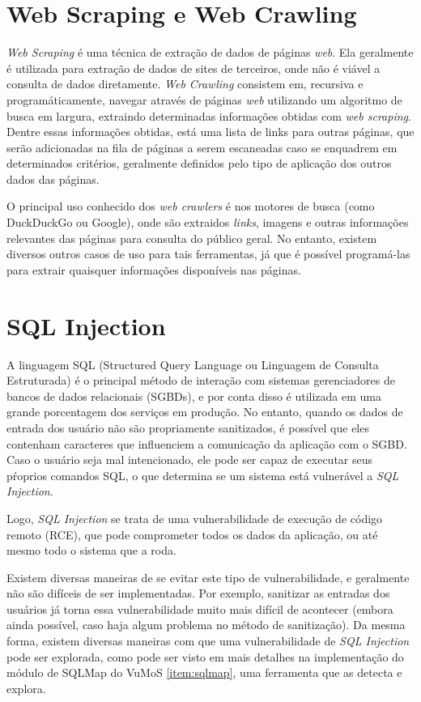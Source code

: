 \section{Web Scraping e Web Crawling}

\textit{Web Scraping} é uma técnica de extração de dados de páginas \textit{web}. Ela geralmente é utilizada para extração de dados de sites de terceiros, onde não é viável a consulta de dados diretamente. 
\textit{Web Crawling} consistem em, recursiva e programáticamente, navegar através de páginas \textit{web} utilizando um algoritmo de busca em largura, extraindo determinadas informações obtidas com \textit{web scraping}. Dentre essas informações obtidas, está uma lista de links para outras páginas, que serão adicionadas na fila de páginas a serem escaneadas caso se enquadrem em determinados critérios, geralmente definidos pelo tipo de aplicação dos outros dados das páginas.

O principal uso conhecido dos \textit{web crawlers} é nos motores de busca (como DuckDuckGo ou Google), onde são extraidos \textit{links}, imagens e outras informações relevantes das páginas para consulta do público geral. No entanto, existem diversos outros casos de uso para tais ferramentas, já que é possível programá-las para extrair quaisquer informações disponíveis nas páginas. 

\section{SQL Injection}

A linguagem SQL (Structured Query Language ou Linguagem de Consulta Estruturada) é o principal método de interação com sistemas gerenciadores de bancos de dados relacionais (SGBDs), e por conta disso é utilizada em uma grande porcentagem dos serviços em produção. No entanto, quando os dados de entrada dos usuário não são propriamente sanitizados, é possível que eles contenham caracteres que influenciem a comunicação da aplicação com o SGBD. Caso o usuário seja mal intencionado, ele pode ser capaz de executar seus pŕoprios comandos SQL, o que determina se um sistema está vulnerável a \textit{SQL Injection}. 

Logo, \textit{SQL Injection} se trata de uma vulnerabilidade de execução de código remoto (RCE), que pode comprometer todos os dados da aplicação, ou até mesmo todo o sistema que a roda. 

Existem diversas maneiras de se evitar este tipo de vulnerabilidade, e geralmente não são difíceis de ser implementadas. Por exemplo, sanitizar as entradas dos usuários já torna essa vulnerabilidade muito mais difícil de acontecer (embora ainda possível, caso haja algum problema no método de sanitização). Da mesma forma, existem diversas maneiras com que uma vulnerabilidade de \textit{SQL Injection} pode ser explorada, como pode ser visto em mais detalhes na implementação do módulo de SQLMap do VuMoS \ref{item:sqlmap}, uma ferramenta que as detecta e explora.  